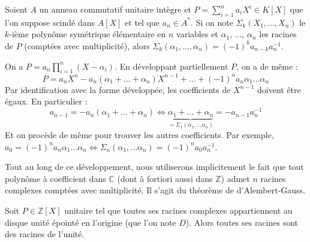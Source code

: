 




	\begin{lemma}
		\label{kronecker-1}
		Soient $A$ un anneau commutatif unitaire intègre et $P = \sum_{i=1}^n a_iX^i \in K[X]$ que l'on suppose scindé dans $A[X]$ et tel que $a_n \in A^*$. Si on note $\Sigma_k(X_1, \dots, X_n)$ le $k$-ième polynôme symétrique élémentaire en $n$ variables et $\alpha_1$, ..., $\alpha_n$ les racines de $P$ (comptées avec multiplicité), alors $\Sigma_k(\alpha_1, \dots, \alpha_n) = (-1)^k a_{n-k} a_n^{-1}$.
	\end{lemma}

	\begin{demonstration}
		On a $P = a_n \prod_{i=1}^n (X-\alpha_i)$. En développant partiellement $P$, on a de même :
		\[ P = a_n X^n - a_n (\alpha_1 + \dots + \alpha_n)X^{n-1} + \dots + (-1)^n a_n \alpha_1 \dots \alpha_n \]
		Par identification avec la forme développée, les coefficients de $X^{n-1}$ doivent être égaux. En particulier :
		\[ a_{n-1} = -a_n (\alpha_1 + \dots + \alpha_n) \iff \underbrace{\alpha_1 + \dots + \alpha_n}_{= \Sigma_1(\alpha_1, \dots \alpha_n)} = - a_{n-1} a_n^{-1} \]
		Et on procède de même pour trouver les autres coefficients. Par exemple, $a_0 = (-1)^n a_n \alpha_1 \dots \alpha_n \iff \Sigma_n(\alpha_1, \dots \alpha_n) = (-1)^n a_0 a_n^{-1}$.
	\end{demonstration}

	\begin{remark}
		Tout au long de ce développement, nous utiliserons implicitement le fait que tout polynôme à coefficient dans $\mathbb{C}$ (dont à fortiori aussi dans $\mathbb{Z}$) admet $n$ racines complexes comptées avec multiplicité. Il s'agit du théorème de d'Alembert-Gauss.
	\end{remark}


	\begin{theorem}[Kronecker]
		\label{kronecker-2}
		Soit $P \in \mathbb{Z}[X]$ unitaire tel que toutes ses racines complexes appartiennent au disque unité épointé en l'origine (que l'on note $D$). Alors toutes ses racines sont des racines de l'unité.
	\end{theorem}

